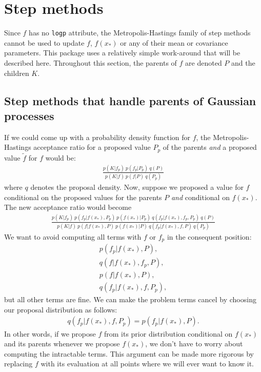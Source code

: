 \section{Step methods}
\label{sec:step-methods} 
Since $f$ has no \texttt{logp} attribute, the Metropolis-Hastings family of step methods cannot be used to update $f$, $f(x_*)$ or any of their mean or covariance parameters. This package uses a relatively simple work-around that will be described here. Throughout this section, the parents of $f$ are denoted $P$ and the children $K$.


\subsection{Step methods that handle parents of Gaussian processes}
If we could come up with a probability density function for $f$, the Metropolis-Hastings acceptance ratio for a proposed value $P_p$ of the parents \emph{and} a proposed value $\tilde f$ for $f$ would be:
\begin{eqnarray*}
    \frac{p(K|f_p)\ p(f_p|P_p)\ q(P)}{p(K|f)\ p(f|P)\ q(P_p)}
\end{eqnarray*}
where $q$ denotes the proposal density. Now, suppose we proposed a value for $f$ conditional on the proposed values for the parents $P$ \emph{and} conditional on $f(x_*)$. The new acceptance ratio would become
\begin{eqnarray*}
    \frac{p(K|f_p)\ p(f_p|f(x_*), P_p)\ p(f(x_*) | P_p)\ q(f_p|f(x_*),f_p, P_p)\ q(P)}{p(K|f)\ p(f|f(x_*), P)\ p(f(x_*) | P)\ q(f_p|f(x_*),f,P)\ q(P_p)}
\end{eqnarray*}
 We want to avoid computing all terms with $f$ or $f_p$ in the consequent position:
\begin{eqnarray*}
    p(f_p|f(x_*), P),\\ q(f|f(x_*),f_p,P),\\ p(f|f(x_*), P),\\ q(f_p|f(x_*),f,P_p),
\end{eqnarray*}
but all other terms are fine. We can make the problem terms cancel by choosing our proposal distribution as follows:
\begin{eqnarray*}
    q(f_p|f(x_*),f,P_p) = p(f_p|f(x_*), P).
\end{eqnarray*}
In other words, if we propose $f$ from its prior distribution conditional on $f(x_*)$ and its parents whenever we propose $f(x_*)$, we don't have to worry about computing the intractable terms. This argument can be made more rigorous by replacing $f$ with its evaluation at all points where we will ever want to know it.

